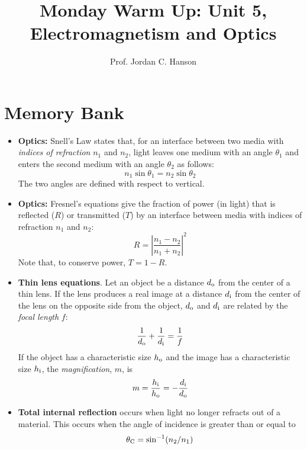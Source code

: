 \documentclass{article}
\begin{document}
\twocolumn

\title{Monday Warm Up: Unit 5, Electromagnetism and Optics}
\author{Prof. Jordan C. Hanson}

\maketitle

\section{Memory Bank}

\begin{itemize}
\item \textbf{Optics:} Snell's Law states that, for an interface between two media with \textit{indices of refraction} $n_1$ and $n_2$, light leaves one medium with an angle $\theta_1$ and enters the second medium with an angle $\theta_2$ as follows:
\begin{equation}
n_1 \sin\theta_1 = n_2\sin\theta_2
\end{equation}
\noindent The two angles are defined with respect to vertical.
\item \textbf{Optics:} Fresnel's equations give the fraction of power (in light) that is reflected ($R$) or transmitted ($T$) by an interface between media with indices of refraction $n_1$ and $n_2$:
\begin{equation}
R = \left| \frac{n_1 - n_2}{n_1 + n_2} \right|^2 \label{eq:2}
\end{equation}
\noindent Note that, to conserve power, $T = 1 - R$.
\item \textbf{Thin lens equations}.  Let an object be a distance $d_{\rm o}$ from the center of a thin lens.  If the lens produces a real image at a distance $d_{\rm i}$ from the center of the lens on the opposite side from the object, $d_{\rm o}$ and $d_{\rm i}$ are related by the \textit{focal length} $f$:
\begin{equation}
\frac{1}{d_{\rm o}}+\frac{1}{d_{\rm i}} = \frac{1}{f}
\end{equation}
If the object has a characteristic size $h_{\rm o}$ and the image has a characteristic size $h_{\rm i}$, the \textit{magnification}, $m$, is
\begin{equation}
m = \frac{h_{\rm i}}{h_{\rm o}} = -\frac{d_{\rm i}}{d_{\rm o}}
\end{equation}
\item \textbf{Total internal reflection} occurs when light no longer refracts out of a material.  This occurs when the angle of incidence is greater than or equal to
\begin{equation}
\theta_{\rm C} = \sin^{-1}(n_2/n_1)
\end{equation}
\end{itemize}
\end{document}
